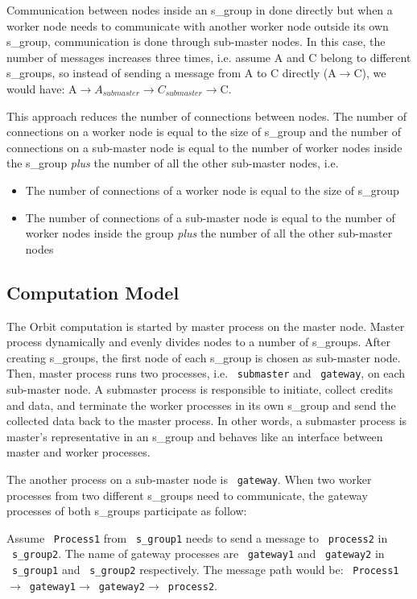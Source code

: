\documentclass[11pt,a4paper]{article}
\begin{document}
Communication between nodes inside an s\_group in done directly but when a worker node needs to communicate with another worker node outside its own s\_group, communication is done through sub-master nodes. In this case, the number of messages increases three times, i.e. assume A and C belong to different s\_groups, so instead of sending a message from A to C directly (A$\rightarrow$C), we would have: A$\rightarrow A_{submaster}\rightarrow C_{submaster}\rightarrow$C. 

This approach reduces the number of connections between nodes. The  number of connections on a worker node is equal to the size of s\_group and the number of connections on a sub-master node is equal to the number of worker nodes inside the s\_group \emph{plus} the number of all the other sub-master nodes, i.e.
\begin{itemize}
\item The number of connections of a worker node is equal to the size of s\_group 
\item The number of connections of a sub-master node is equal to the number of worker nodes inside the group \emph{plus} the number of all the other sub-master nodes
\end{itemize}

\subsection*{Computation Model}

The Orbit computation is started by master process on the master node. Master process dynamically and evenly divides  nodes to a number of s\_groups. After creating s\_groups, the first node of each s\_group is chosen as sub-master node. Then, master process runs two processes, i.e. ~\texttt{submaster} and ~\texttt{gateway}, on each sub-master node. A submaster process is responsible to initiate, collect credits and data, and terminate the worker processes in its own s\_group and send the collected data back to the master process. In other words, a submaster process is master's representative in an s\_group and behaves like an interface between master and worker processes.

The another process on a sub-master node is ~\texttt{gateway}. When two worker processes from two different s\_groups need to communicate, the gateway processes of both s\_groups participate as follow:

Assume ~\texttt{Process1} from ~\texttt{s\_group1} needs to send a message to ~\texttt{process2} in ~\texttt{s\_group2}. The name of gateway processes are ~\texttt{gateway1} and ~\texttt{gateway2} in ~\texttt{s\_group1} and ~\texttt{s\_group2} respectively. The message path would be: ~\texttt{Process1}$\rightarrow$~\texttt{gateway1}$\rightarrow$~\texttt{gateway2}$\rightarrow$~\texttt{process2}. 
\end{document}
